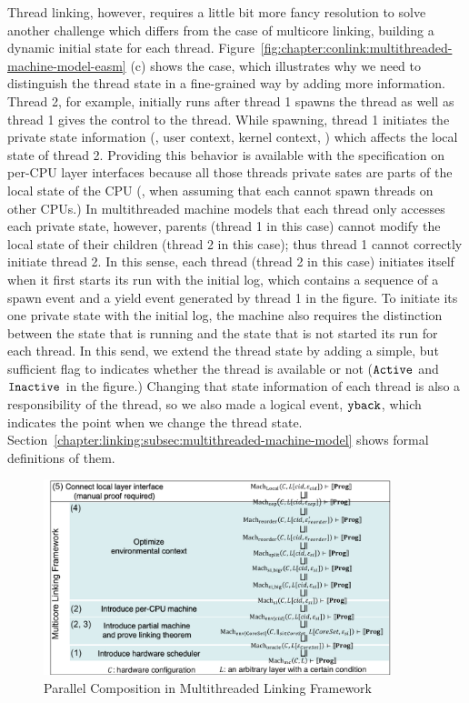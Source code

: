Thread linking, however, requires a little bit more fancy resolution to solve another challenge which differs from the case of multicore linking, building a dynamic initial state for each thread.
Figure~\ref{fig:chapter:conlink:multithreaded-machine-model-easm} (c) 
shows the case, which illustrates why we need to distinguish the thread state in a fine-grained way by adding more information. 
Thread 2, for example, initially runs after thread 1 spawns the thread as well as thread 1 gives the control to the thread. 
While spawning, thread 1 initiates the private state information (\eg, user context, kernel context, \etc) which affects the local state of thread 2. 
Providing this behavior is available with the specification on per-CPU layer interfaces because all those threads private sates are parts of the local state of the CPU (\ie, when assuming that each cannot spawn threads on other CPUs.)
In multithreaded machine models that each thread only accesses each private state, however, 
parents (thread 1 in this case) cannot modify the local state of their children (thread 2 in this case); thus thread 1 cannot correctly initiate thread 2.
In this sense,
each thread (thread 2 in this case) initiates itself when it first starts its run with the initial log,
which contains a sequence of a spawn event and a yield event generated by thread 1 in the figure. 
To initiate its one private state with the initial log, 
the machine also requires the distinction between the state that is running and the state that is not started its run for each thread.
In this send, we extend the thread state by adding a simple, but sufficient flag to indicates whether the thread is available or not (${\mathrm{\texttt{Active}}}$ and ${\mathrm{\texttt{Inactive}}}$ in the figure.)
Changing that state information of each thread is also a responsibility of the thread,
so we also made a logical event, ${\mathrm{\texttt{yback}}}$, which indicates the point when we change the thread state.
Section~\ref{chapter:linking:subsec:multithreaded-machine-model} shows formal definitions of them. 

\begin{figure}
\begin{center}
\includegraphics[width=0.9\textwidth, page=6]{figs/conlink/concurrent_linking}
\end{center}
\caption{Parallel Composition in Multithreaded Linking Framework}
\label{fig:chapter:conlink:parallel-composition-in-easm}
\end{figure}

